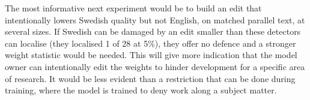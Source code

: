 \documentclass[11pt,a4paper]{article}
\begin{document}
The most informative next experiment would be to build an edit that intentionally lowers Swedish
quality but not English, on matched parallel text, at several sizes. If Swedish can be damaged by
an edit smaller than these detectors can localise (they localised 1 of 28 at 5\%), they offer no
defence and a stronger weight statistic would be needed. This will give more indication that the
model owner can intentionally edit the weights to hinder development for a specific area of
research. It would be less evident than a restriction that can be done during training, where the
model is trained to deny work along a subject matter.
\end{document}
